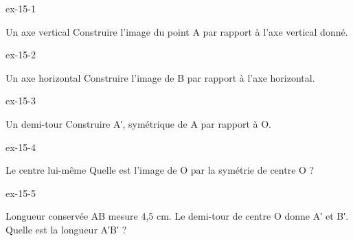 \clearpage{}
\begin{blocLivre}{ex-15-1}\begin{exercice}[1]{Un axe vertical}
Construire l’image du point A par rapport à l’axe vertical donné.
\label{fig-ex-15-1}
\end{exercice}\end{blocLivre}
\begin{blocLivre}{ex-15-2}\begin{exercice}[1]{Un axe horizontal}
Construire l’image de B par rapport à l’axe horizontal.
\label{fig-ex-15-2}
\end{exercice}\end{blocLivre}
\begin{blocLivre}{ex-15-3}\begin{exercice}[1]{Un demi-tour}
Construire A′, symétrique de A par rapport à O.
\label{fig-ex-15-3}
\end{exercice}\end{blocLivre}
\begin{blocLivre}{ex-15-4}\begin{exercice}[1]{Le centre lui-même}
Quelle est l’image de O par la symétrie de centre O ?
\label{fig-ex-15-4}
\end{exercice}\end{blocLivre}
\begin{blocLivre}{ex-15-5}\begin{exercice}[1]{Longueur conservée}
AB mesure 4,5 cm. Le demi-tour de centre O donne A′ et B′. Quelle est la longueur A′B′ ?
\label{fig-ex-15-5}
\end{exercice}\end{blocLivre}


